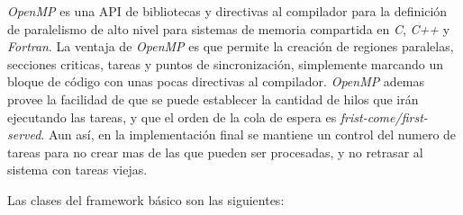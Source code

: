 \emph{OpenMP} es una API de bibliotecas y directivas al compilador para la
definición de paralelismo de alto nivel para sistemas de memoria compartida en
\emph{C}, \emph{C++} y \emph{Fortran}\cite{ompWeb}. La ventaja de \emph{OpenMP}
es que permite la creación de regiones paralelas, secciones criticas, tareas y
puntos de sincronización, simplemente marcando un bloque de código con unas
pocas directivas al compilador. \emph{OpenMP} ademas provee la facilidad de que
se puede establecer la cantidad de hilos que irán ejecutando las tareas, y que
el orden de la cola de espera es \emph{frist-come/first-served}. Aun así, en la
implementación final se mantiene un control del numero de tareas para no crear
mas de las que pueden ser procesadas, y no retrasar al sistema con tareas
viejas.

Las clases del framework básico son las siguientes:

